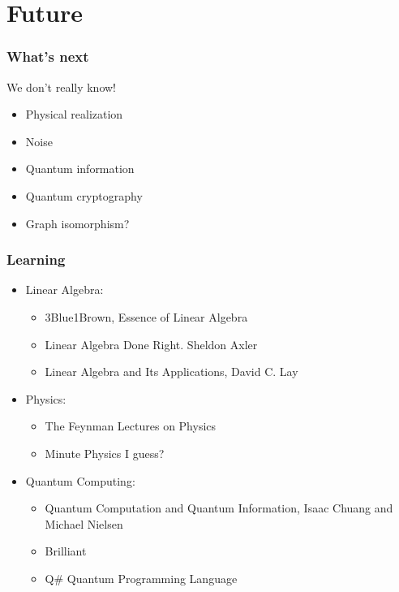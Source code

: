 \documentclass{beamer}
\begin{document}
        \section{Future}
        \begin{frame}
            \frametitle{What's next}
            We don't really know!
            \begin{itemize}
                \item Physical realization
                \item Noise
                \item Quantum information
                \item Quantum cryptography
                \item Graph isomorphism?
            \end{itemize}
        \end{frame}
        \begin{frame}
            \frametitle{Learning}
            \begin{itemize}
                \item Linear Algebra: \begin{itemize}
                    \item 3Blue1Brown, Essence of Linear Algebra
                    \item Linear Algebra Done Right. Sheldon Axler
                    \item Linear Algebra and Its Applications, David C. Lay
                \end{itemize}
                \item Physics: \begin{itemize}
                    \item  The Feynman Lectures on Physics 
                    \item Minute Physics I guess?
                \end{itemize}
                \item Quantum Computing: \begin{itemize}
                    \item Quantum Computation and Quantum Information, Isaac Chuang and Michael Nielsen
                    \item Brilliant
                    \item Q\# Quantum Programming Language
                \end{itemize}
            \end{itemize}
        \end{frame}
    
\end{document}
